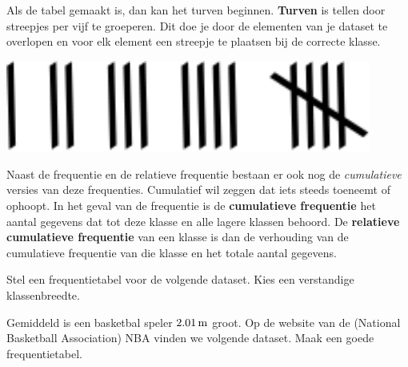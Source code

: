\documentclass[12pt,twoside,a4paper]{article}
\begin{document}
\begin{minipage}{0.8\linewidth}
Als de tabel gemaakt is, dan kan het turven beginnen. {\bf Turven} is tellen door streepjes per vijf te groeperen. Dit doe je door de elementen van je dataset te overlopen en voor elk element een streepje te plaatsen bij de correcte klasse.
\end{minipage}
\begin{minipage}{0.2\linewidth}
\begin{center}
\includegraphics[width=0.9\textwidth]{turven}
\end{center}
\end{minipage}

Naast de frequentie en de relatieve frequentie bestaan er ook nog de {\it cumulatieve} versies van deze frequenties. Cumulatief wil zeggen dat iets steeds toeneemt of ophoopt. In het geval van de frequentie is de {\bf cumulatieve frequentie} het aantal gegevens dat tot deze klasse en alle lagere klassen behoord. De {\bf relatieve cumulatieve frequentie} van een klasse is dan de verhouding van de cumulatieve frequentie van die klasse en het totale aantal gegevens.

\begin{oefening}
  Stel een frequentietabel voor de volgende dataset. Kies een verstandige klassenbreedte.
\end{oefening}

\begin{oefening}
  Gemiddeld is een basketbal speler $2.01 \m$ groot. Op de website van de (National Basketball Association) NBA vinden we volgende dataset.
  Maak een goede frequentietabel.
\end{oefening}
\end{document}
